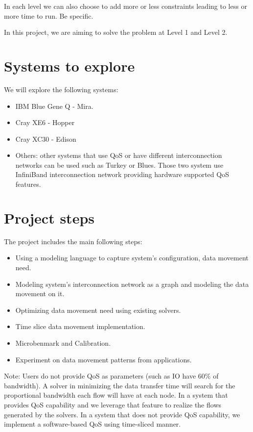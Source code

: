 \documentclass[letter]{article}
\begin{document}
In each level we can also choose to add more or less constraints leading to less or more time to run. Be specific.

In this project, we are aiming to solve the problem at Level 1 and Level 2.

\section {Systems to explore}
We will explore the following systems: 
\begin{itemize}
\item IBM Blue Gene Q - Mira.
\item Cray XE6 - Hopper
\item Cray XC30 - Edison
\item Others: other systems that use QoS or have different interconnection networks can be used such as Turkey or Blues. Those two system use InfiniBand interconnection network providing hardware supported QoS features.
\end{itemize}

\section{Project steps}

The project includes the main following steps:
\begin{itemize}
\item Using a modeling language to capture system's configuration, data movement need.
\item Modeling system's interconnection network as a graph and modeling the data movement on it.
\item Optimizing data movement need using existing solvers.
\item Time slice data movement implementation.
\item Microbenmark and Calibration.
\item Experiment on data movement patterns from applications.
\end{itemize}

Note: Users do not provide QoS as parameters (such as IO have 60\% of bandwidth). A solver in minimizing the data transfer time will search for the proportional bandwidth each flow will have at each node. In a system that provides QoS capability and we leverage that feature to realize the flows generated by the solvers. In a system that does not provide QoS capability, we implement a software-based QoS using time-sliced manner.
\end{document}
